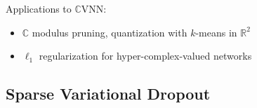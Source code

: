 \documentclass[handout]{beamer}
\newcommand{\real}{\mathbb{R}}
\newcommand{\cplx}{\mathbb{C}}
\begin{document}
\begin{frame}[c]{\insertsection}
  \bigskip
  Applications to $\cplx$VNN:
  \begin{itemize}
    \item $\cplx$ modulus pruning, quantization with $k$-means in $
        \real^2%
      $\textsuperscript{
        \citep{wu_compressing_2019}}

    \smallskip
    \item $\ell_1$ regularization for hyper-complex-valued networks\textsuperscript{
        \citep{vecchi_compressing_2020}}

  \end{itemize}

\end{frame}

\subsection{Sparse Variational Dropout} %
\label{sub:sparse_variational_dropout}
\end{document}
